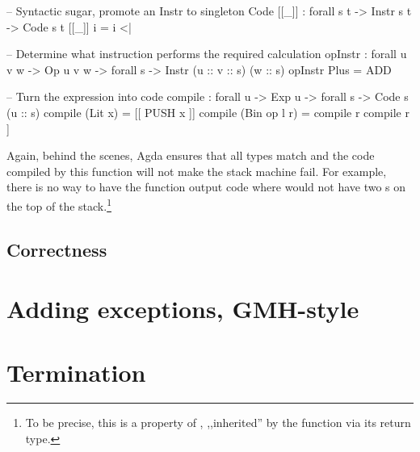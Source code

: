 \begin{code}
  -- Syntactic sugar, promote an Instr to singleton Code
  [[_\;]] : forall {s t} -> Instr s t -> Code s t
  [[_\;]] i = i <| \nil

  -- Determine what instruction performs the required calculation
  opInstr : forall {u v w} -> Op u v w -> forall {s} -> Instr (u :: v :: s) (w :: s)
  opInstr Plus = ADD

  -- Turn the expression into code
  compile : forall {u} -> Exp u -> forall {s} -> Code s (u :: s)
  compile (Lit x) = [[ PUSH x ]]
  compile (Bin op l r) = compile r \app compile r \app [[ opInstr op ]]
\end{code}

Again, behind the scenes, Agda ensures that all types match and the code
compiled by this function will not make the stack machine fail. For example,
there is no way to have the function  output code where
 would not have two s on the top of the
stack.\footnote{To be precise, this is a property of ,
,,inherited'' by the function  via its return type.}

\subsection{Correctness}

\section{Adding exceptions, GMH-style}

\section{Termination}
